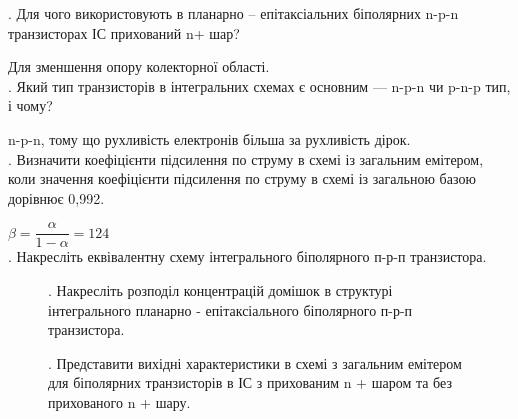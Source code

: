 \documentclass[a4paper,14pt]{extreport}
\begin{document}
. Для чого використовують в планарно – епітаксіальних біполярних n-p-n транзисторах ІС прихований n+ шар?\par
Для зменшення опору колекторної області.\\
. Який тип транзисторів в інтегральних схемах є основним — n-p-n чи p-n-p тип, і чому?\par
 n-p-n, тому що рухливість електронів більша за рухливість дірок.\\
. Визначити коефіцієнти підсилення по струму в схемі із загальним емітером, коли значення коефіцієнти підсилення по струму в схемі із загальною базою дорівнює 0,992.\par
$\beta = \dfrac{\alpha}{1-\alpha} = 124$\\
. Накресліть еквівалентну схему інтегрального біполярного п-р-п транзистора.\par
\begin{figure}[h!]
. Накресліть розподіл концентрацій домішок в структурі інтегрального планарно - епітаксіального біполярного п-р-п транзистора.\par



\end{figure}
\begin{figure}[h!]
. Представити вихідні характеристики в схемі з загальним емітером для біполярних транзисторів в ІС з прихованим n + шаром та без прихованого
n + шару.\par

\end{figure}
\end{document}
